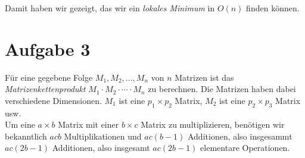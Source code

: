 \documentclass[11pt,a4paper,ngerman]{article}
\begin{document}
Damit haben wir gezeigt, das wir ein \emph{lokales Minimum} in $O(n)$ finden können.

\section*{Aufgabe 3}

Für eine gegebene Folge $M_1 , M_2, ... , M_n$ von $n$ Matrizen ist das \emph{Matrizenkettenprodukt} $M_1 \cdot M_2 \cdot \cdots \cdot M_n$ zu berechnen. Die Matrizen haben dabei verschiedene Dimensionen. $M_1$ ist eine $p_1 \times p_2$ Matrix, $M_2$ ist eine $p_2 \times p_3$ Matrix usw.\\

Um eine $a\times b$ Matrix mit einer $b \times c$ Matrix zu multiplizieren, benötigen wir bekanntlich $acb$ Multiplikationen und $ac\left( b - 1 \right)$ Additionen, also insgesammt $ac \left( 2b - 1\right)$ Additionen, also insgesamt $ac\left( 2b - 1\right)$ elementare Operationen.
\end{document}
